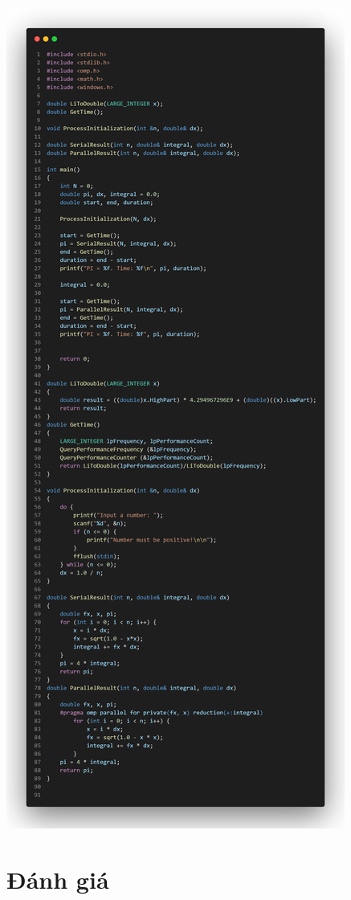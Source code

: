 \documentclass[12pt,a4paper]{report}
\begin{document}
\begin{center}
\clearpage
	\includegraphics[trim=0in 0in 0in 19.75in, clip, scale=0.25]{./Photos/PI/parallel.PNG}
\end{center}
\section{Đánh giá}
\end{document}
